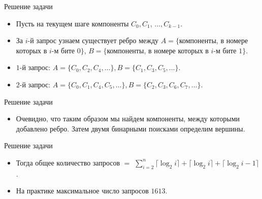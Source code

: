 \begin{frame}[t]{Решение задачи}
	\begin{itemize}
		\item Пусть на текущем шаге компоненты $C_{0}, C_{1}$, $\ldots, C_{k - 1}$.
		\item За $i$-й запрос узнаем существует ребро между $A = \{$компоненты, в номере которых в $i$-м бите $0\}$, $B = \{$компоненты, в номере которых в $i$-м бите $1\}$.
		\item $1$-й запрос: $A = \{ C_{0}, C_{2}, C_{4}, \ldots \}, B = \{ C_{1}, C_{3}, C_{5}, \ldots \}$.
		\item $2$-й запрос: $A = \{ C_{0}, C_{1}, C_{4}, C_{5}, \ldots \}, B = \{ C_{2}, C_{3}, C_{6}, C_{7}, \ldots \}$.
	\end{itemize}
\end{frame}
	

\begin{frame}[t]{Решение задачи}
	\begin{itemize}
		\item Очевидно, что таким образом мы найдем компоненты, между которыми добавлено ребро. Затем двумя бинарными поисками определим вершины.
	\end{itemize}
\end{frame}
	
	
	\begin{frame}[t]{Решение задачи}
		\begin{itemize}
			\item Тогда общее количество запросов $=$ $\sum\limits_{i = 2}^n { \lceil\log_2{i}\rceil + \lceil\log_2{i}\rceil + \lceil\log_2{i} - 1}\rceil $.
			\item На практике максимальное число запросов $1613$.
		\end{itemize}
	\end{frame}
